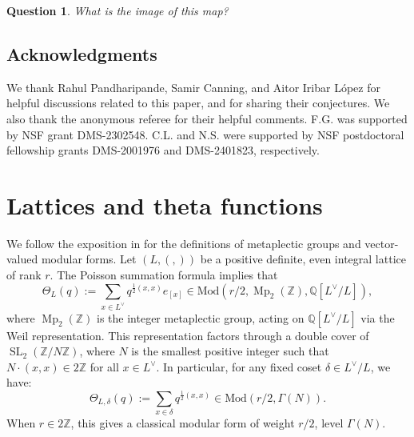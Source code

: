 \documentclass[12pt]{amsart}
\def\bC{\mathbb{C}}
\def\bQ{\mathbb{Q}}
\def\bZ{\mathbb{Z}}
\DeclareMathOperator{\SL}{SL}
\DeclareMathOperator{\Mp}{Mp}
\newcommand{\Mod}{\mathrm{Mod}}
\newtheorem{question}{Question}
\theoremstyle{definition}
\newcommand{\CL}[1]{{\color{blue}CL: #1}}
\begin{document}
\begin{question}
    What is the image of this map?
\end{question}

\subsection{Acknowledgments} 

We thank Rahul Pandharipande, Samir Canning, and Aitor Iribar L\'{o}pez for helpful discussions related to this paper, and for sharing their conjectures. We also thank the anonymous referee for their helpful comments. F.G. was supported by NSF grant DMS-2302548. C.L. and N.S. were supported by NSF postdoctoral fellowship grants DMS-2001976 and DMS-2401823, respectively. 


\section{Lattices and theta functions}
We follow the exposition in \cite{mp} for the definitions of metaplectic groups and vector-valued modular forms.
Let $(L,(,))$ be a positive definite, even integral lattice of rank $r$. The Poisson summation formula implies that 
$$\Theta_L(q) := \sum_{x\in L^\vee} q^{\frac{1}{2}(x,x)}e_{[x]}\in \Mod(r/2,\Mp_2(\bZ),\bQ[L^\vee/L]),$$
where $\Mp_2(\bZ)$ is the integer metaplectic group, acting on $\bQ[L^\vee/L]$ via the Weil representation. This representation factors through a double cover of $\SL_2(\bZ/N\bZ)$, where $N$ is the smallest positive integer such that $N\cdot (x,x)\in 2\bZ$ for all $x\in L^\vee$. In particular, for any fixed coset $\delta\in L^\vee/L$, we have:
$$\Theta_{L,\delta}(q) := \sum_{x\in \delta} q^{\frac{1}{2}(x,x)} \in \Mod(r/2,\Gamma(N)).$$
When $r\in 2\bZ$, this gives a classical modular form of weight $r/2$, level $\Gamma(N)$.
\end{document}
